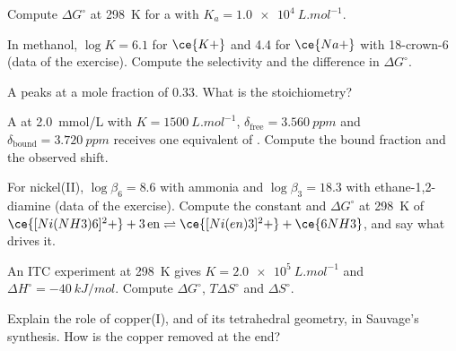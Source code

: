 \begin{exercise}[$\star$]\label{exo:b3:supramolecular:2}
Compute $\Delta G^\circ$ at \qty{298}{K} for a  with $K_a = \qty{1.0e4}{L.mol^{-1}}$.
\end{exercise}

\begin{exercise}[$\star$]\label{exo:b3:supramolecular:3}
In methanol, $\log K = 6.1$ for $\ce{K+}$ and 4.4 for $\ce{Na+}$ with 18-crown-6 (data of the exercise).
Compute the selectivity and the difference in $\Delta G^\circ$.
\end{exercise}

\begin{exercise}[$\star$]\label{exo:b3:supramolecular:4}
A  peaks at a  mole fraction of 0.33. What is the stoichiometry?
\end{exercise}

\begin{exercise}[$\star\star$]\label{exo:b3:supramolecular:5}
A  at \qty{2.0}{mmol/L} with $K = \qty{1500}{L.mol^{-1}}$, $\delta_{\mathrm{free}} = \qty{3.560}{ppm}$ and $\delta_{\mathrm{bound}} = \qty{3.720}{ppm}$ receives one
equivalent of . Compute the bound fraction and the observed shift.
\end{exercise}

\begin{exercise}[$\star\star$]\label{exo:b3:supramolecular:6}
For nickel(II), $\log\beta_6 = 8.6$ with ammonia and $\log\beta_3 = 18.3$ with ethane-1,2-diamine (data of the
exercise). Compute the constant and $\Delta G^\circ$ at \qty{298}{K} of
$\ce{[Ni(NH3)6]^2+} + 3\,\mathrm{en} \rightleftharpoons \ce{[Ni(en)3]^2+} + \ce{6NH3}$, and say what drives it.
\end{exercise}

\begin{exercise}[$\star\star$]\label{exo:b3:supramolecular:7}
An ITC experiment at \qty{298}{K} gives $K = \qty{2.0e5}{L.mol^{-1}}$ and $\Delta H^\circ = \qty{-40}{kJ/mol}$. Compute $\Delta G^\circ$, $T\Delta S^\circ$ and
$\Delta S^\circ$.
\end{exercise}

\begin{exercise}[$\star\star$]\label{exo:b3:supramolecular:8}
Explain the role of copper(I), and of its tetrahedral geometry, in Sauvage's
 synthesis. How is the copper removed at the end?
\end{exercise}

